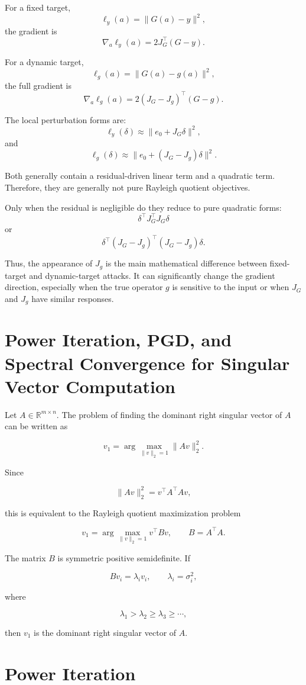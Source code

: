 \documentclass{article}
\begin{document}
For a fixed target,
\[
    \ell_y(a)=\|G(a)-y\|^2,
\]
the gradient is
\[
    \nabla_a \ell_y(a)
    =
    2J_G^\top(G-y).
\]

For a dynamic target,
\[
    \ell_g(a)=\|G(a)-g(a)\|^2,
\]
the full gradient is
\[
    \nabla_a \ell_g(a)
    =
    2(J_G-J_g)^\top(G-g).
\]

The local perturbation forms are:
\[
    \ell_y(\delta)
    \approx
    \|e_0+J_G\delta\|^2,
\]
and
\[
    \ell_g(\delta)
    \approx
    \|e_0+(J_G-J_g)\delta\|^2.
\]

Both generally contain a residual-driven linear term and a quadratic term. Therefore, they are generally not pure Rayleigh quotient objectives.

Only when the residual is negligible do they reduce to pure quadratic forms:
\[
    \delta^\top J_G^\top J_G\delta
\]
or
\[
    \delta^\top (J_G-J_g)^\top(J_G-J_g)\delta.
\]

Thus, the appearance of \(J_g\) is the main mathematical difference between fixed-target and dynamic-target attacks. It can significantly change the gradient direction, especially when the true operator \(g\) is sensitive to the input or when \(J_G\) and \(J_g\) have similar responses.

\section{Power Iteration, PGD, and Spectral Convergence for Singular Vector Computation}

Let \(A\in\mathbb{R}^{m\times n}\). The problem of finding the dominant right singular vector of \(A\) can be written as

\[
v_1
=
\arg\max_{\|v\|_2=1}\|Av\|_2^2.
\]

Since

\[
\|Av\|_2^2
=
v^\top A^\top A v,
\]

this is equivalent to the Rayleigh quotient maximization problem

\[
v_1
=
\arg\max_{\|v\|_2=1} v^\top Bv,
\qquad
B=A^\top A.
\]

The matrix \(B\) is symmetric positive semidefinite. If

\[
Bv_i=\lambda_i v_i,
\qquad
\lambda_i=\sigma_i^2,
\]

where

\[
\lambda_1>\lambda_2\ge \lambda_3\ge\cdots,
\]

then \(v_1\) is the dominant right singular vector of \(A\).

\section{Power Iteration}
\end{document}
